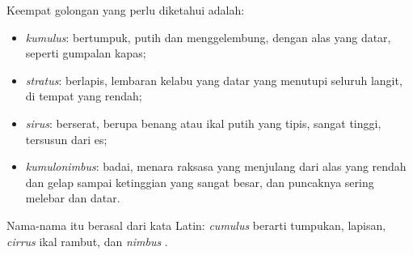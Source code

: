 \begin{definition}\label{def:g4:clouds-rain-snow:cloud-families}
Keempat golongan  yang perlu diketahui adalah:
\begin{itemize}
  \item \emph{kumulus}:  bertumpuk, putih dan
        menggelembung, dengan alas yang datar, seperti gumpalan kapas;
  \item \emph{stratus}:  berlapis, lembaran kelabu yang
        datar yang menutupi seluruh langit, di tempat yang rendah;
  \item \emph{sirus}:  berserat, berupa benang atau ikal
        putih yang tipis, sangat tinggi, tersusun dari es;
  \item \emph{kumulonimbus}:  badai, menara raksasa
        yang menjulang dari alas yang rendah dan gelap sampai ketinggian
        yang sangat besar, dan puncaknya sering melebar dan datar.
\end{itemize}
\end{definition}

Nama-nama itu berasal dari kata Latin: \emph{cumulus} berarti tumpukan,
\emph{} lapisan, \emph{cirrus} ikal rambut, dan \emph{nimbus} 
.

